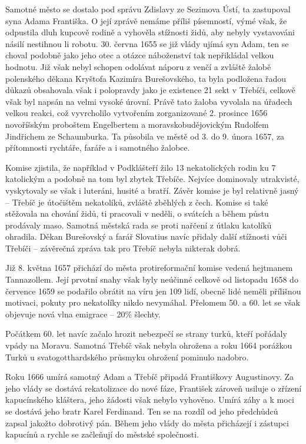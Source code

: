 \documentclass[a4paper,oneside,12p]{report}
\begin{document}
Samotné město se dostalo pod správu Zdislavy ze Sezimova Ústí, ta zastupoval syna Adama Františka.
O její zprávě nemáme příliš písemností, výmé však, že odpustila dluh kupcově rodině a vyhověla stížnosti židů, aby nebyly vystavováni násilí nestihnou li robotu.
30. června 1655 se již vlády ujímá syn Adam, ten se choval podobně jako jeho otec a otázce náboženství tak nepřikládal velkou hodnotu.
Již však nebyl schopen odolávat náporu z venčí a zvláště žalobě polenského děkana Kryštofa Kazimíra Burešovského, ta byla podložena řadou důkazů obsahovala však i polopravdy jako je existence 21 sekt v Třebíči, celkově však byl napsán na velmi vysoké úrovní.
Právě tato žaloba vyvolala na úřadech velkou reakci, což vyvrcholilo vytvořením  zorganizované 2. prosince 1656 novoříšským proboštem Engelbertem a moravskobudějovickým Rudolfem Jindřichem ze Schaumburka.
Ta působila ve městě od 3. do 9. února 1657, za přítomnosti rychtáře, faráře a i samotného žalobce. %

Komise zjistila, že například v Podklášteří žilo 13 nekatolických rodin ku 7 katolickým a podobně na tom byl zbytek Třebíče.
Nejvíce dominovaly utrakvisté, vyskytovaly se však i luteráni, husité a  bratří.
Závěr komise je byl relativně jasný -- Třebíč je útočištěm nekatolíků, zvláště zběhlých z čech.
Komise si také stěžovala na chování židů, ti pracovali v neděli, o svátcích a během půstu prodávaly maso.
Samotná městská rada se proti nařčení z útlaku katolíků ohradila.
Děkan Burešovský a farář Slovatius navíc přidaly další stížnosti vůči Třebíči -- závěrečná zpráva tak pro Třebíč nebyla nikterak dobrá.  %

Již 8. května 1657 přichází do města protireformační komise vedená hejtmanem Tannazollem.
Její prvotní snahy však byly neúčinné celkově od listopadu 1658 do července 1659 se podařilo obrátit na  víru jen 109 lidí, obecně lidé neměli přílišnou motivaci, pokuty pro nekatolíky nikdo nevymáhal.
Přelomem 50. a 60. let se však objevuje nová vlna emigrace -- 20\% šlechty. %

Počátkem 60. let navíc začalo hrozit nebezpečí se strany turků, kteří pořádaly vpády na Moravu.
Samotná Třebíč však nebyla ohrožena a roku 1664 porážkou Turků u svatogotthardského průsmyku ohrožení pominulo nadobro. %

Roku 1666 umírá samotný Adam a Třebíč připadá Františkovy Augustinovy.
Za jeho vlády se dostává rekatolizace do nové fáze, František zároveň usiluje o zřízení kapucínského kláštera, jeho žádosti však nebylo vyhověno.
Umírá záhy a k moci se dostává jeho bratr Karel Ferdinand.
Ten se na rozdíl od jeho předchůdců zapsal jakožto dobrotivý pán.
Během  jeho vlády do města přicházejí i zástupci kapucínů a rychle se začleňují do městské společnosti. %
\end{document}
